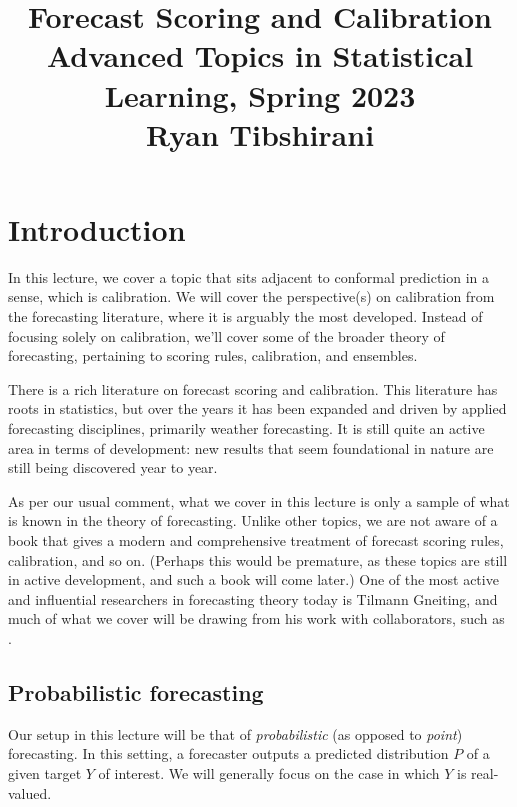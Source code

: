 \documentclass{article}
\title{Forecast Scoring and Calibration \\ \smallskip
\large Advanced Topics in Statistical Learning, Spring 2023 \\ \smallskip
Ryan Tibshirani }
\date{}
\begin{document}
\maketitle
\RaggedRight
\vspace{-50pt}

\section{Introduction}

In this lecture, we cover a topic that sits adjacent to conformal prediction in
a sense, which is calibration. We will cover the perspective(s) on calibration 
from the forecasting literature, where it is arguably the most developed. 
Instead of focusing solely on calibration, we'll cover some of the broader
theory of forecasting, pertaining to scoring rules, calibration, and ensembles.     

There is a rich literature on forecast scoring and calibration. This literature
has roots in statistics, but over the years it has been expanded and driven by
applied forecasting disciplines, primarily weather forecasting. It is still
quite an active area in terms of development: new results that seem foundational
in nature are still being discovered year to year.  

As per our usual comment, what we cover in this lecture is only a sample of what
is known in the theory of forecasting. Unlike other topics, we are not aware of
a book that gives a modern and comprehensive treatment of forecast scoring
rules, calibration, and so on. (Perhaps this would be premature, as these topics
are still in active development, and such a book will come later.) One of the
most active and influential researchers in forecasting theory today is Tilmann
Gneiting, and much of what we cover will be drawing from his work with
collaborators, such as \citet{gneiting2007strictly, gneiting2007probabilistic,
    ranjan2010combining, gneiting2013combining}.

\subsection{Probabilistic forecasting}

Our setup in this lecture will be that of \emph{probabilistic} (as opposed to
\emph{point}) forecasting. In this setting, a forecaster outputs a predicted
distribution $P$ of a given target $Y$ of interest. We will generally focus on
the case in which $Y$ is real-valued.
\end{document}
